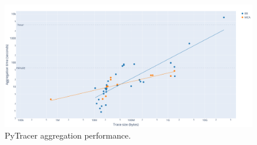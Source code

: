 \documentclass[11pt]{article}
\newcommand{\tristan}[1]{\color{orange}\textbf{From Tristan:} #1\color{black}\xspace}
\newcommand{\pytracer}[0]{PyTracer\xspace}
\begin{document}
\begin{figure}
    \centering
    \includegraphics[width=\linewidth]{figure/performance_parsing.pdf}
    \caption{\pytracer aggregation performance. 
    }
    \label{fig:performance_parsing}
\end{figure}
\end{document}
